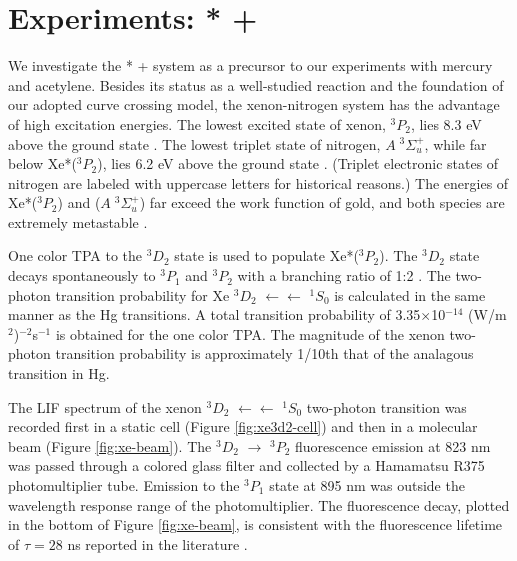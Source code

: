 \documentclass[12pt]{mitthesis}
\begin{document}
\section{Experiments: * + }

We investigate the * +  system as a precursor to our
experiments with mercury and acetylene.  Besides its status as a
well-studied reaction and the foundation of our adopted curve crossing
model, the xenon-nitrogen system has the advantage of high excitation
energies.  The lowest excited state of xenon, $^3P_2$, lies 8.3 eV
above the ground state \cite{saloman04}.  The lowest triplet state of
nitrogen, $A \; ^3\Sigma_u^+$, while far below Xe*($^3P_2$), lies 6.2
eV above the ground state \cite{lofthus77}.  (Triplet electronic
states of nitrogen are labeled with uppercase letters for historical
reasons.)  The energies of Xe*($^3P_2$) and ($A \;
^3\Sigma_u^+$) far exceed the work function of gold, and both species
are extremely metastable \cite{mishra01, lofthus77}.

One color TPA to the $^3D_2$ state is used to populate Xe*($^3P_2$).
The $^3D_2$ state decays spontaneously to $^3P_1$ and $^3P_2$ with a
branching ratio of 1:2 \cite{cabrera81}.  The two-photon transition
probability for Xe $^3D_2$ $\leftarrow\leftarrow$ $^1S_0$ is
calculated in the same manner as the Hg transitions.  A total
transition probability of 3.35$\times$10$^{-14}$
(W/m$^2$)$^{-2}$s$^{-1}$ is obtained for the one color TPA.  The
magnitude of the xenon two-photon transition probability is
approximately 1/10th that of the analagous transition in Hg.

The LIF spectrum of the xenon $^3D_2$ $\leftarrow\leftarrow$ $^1S_0$
two-photon transition was recorded first in a static cell (Figure
\ref{fig:xe3d2-cell}) and then in a molecular beam (Figure
\ref{fig:xe-beam}).  The $^3D_2$ $\rightarrow$ $^3P_2$ fluorescence
emission at 823 nm was passed through a colored glass filter and
collected by a Hamamatsu R375 photomultiplier tube.  Emission to the
$^3P_1$ state at 895 nm was outside the wavelength response range of
the photomultiplier.  The fluorescence decay, plotted in the bottom of
Figure \ref{fig:xe-beam}, is consistent with the fluorescence lifetime
of $\tau = 28$ ns reported in the literature \cite{cabrera81}.
\end{document}

